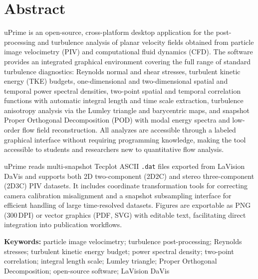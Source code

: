 \documentclass[11pt, a4paper]{report}
\newcommand{\software}[1]{\textsf{#1}}
\begin{document}
\begin{titlepage}
\vspace{0.4cm}
\noindent\colorbox{upblue}{\rule{0pt}{5pt}\hspace{\dimexpr\textwidth+2\fboxsep\relax}}
\end{titlepage}

\clearpage
\thispagestyle{empty}

\section*{Abstract}

\software{uPrime} is an open-source, cross-platform desktop application for the post-processing and turbulence analysis of planar velocity fields obtained from particle image velocimetry (PIV) and computational fluid dynamics (CFD). The software provides an integrated graphical environment covering the full range of standard turbulence diagnostics: Reynolds normal and shear stresses, turbulent kinetic energy (TKE) budgets, one-dimensional and two-dimensional spatial and temporal power spectral densities, two-point spatial and temporal correlation functions with automatic integral length and time scale extraction, turbulence anisotropy analysis via the Lumley triangle and barycentric maps, and snapshot Proper Orthogonal Decomposition (POD) with modal energy spectra and low-order flow field reconstruction. All analyzes are accessible through a labeled graphical interface without requiring programming knowledge, making the tool accessible to students and researchers new to quantitative flow analysis.

\software{uPrime} reads multi-snapshot Tecplot ASCII \texttt{.dat} files exported from LaVision DaVis and supports both 2D two-component (2D2C) and stereo three-component (2D3C) PIV datasets. It includes coordinate transformation tools for correcting camera calibration misalignment and a snapshot subsampling interface for efficient handling of large time-resolved datasets. Figures are exportable as PNG (300\,DPI) or vector graphics (PDF, SVG) with editable text, facilitating direct integration into publication workflows.

\vspace{0.5cm}
\noindent\textbf{Keywords:} particle image velocimetry; turbulence post-processing; Reynolds stresses; turbulent kinetic energy budget; power spectral density; two-point correlation; integral length scale; Lumley triangle; Proper Orthogonal Decomposition; open-source software; LaVision DaVis
\end{document}
